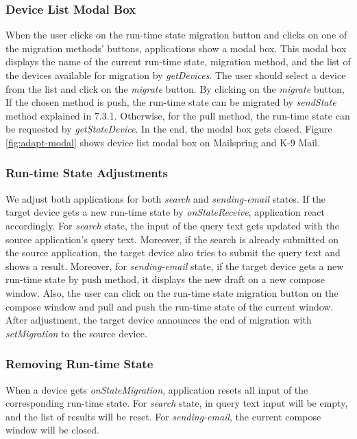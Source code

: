 \subsubsection{Device List Modal Box}
When the user clicks on the run-time state migration button and clicks on one of the migration methods' buttons, applications show a modal box. This modal box displays the name of the current run-time state, migration method, and the list of the devices available for migration by \textit{getDevices}. The user should select a device from the list and click on the \textit{migrate} button. By clicking on the \textit{migrate} button, If the chosen method is push, the run-time state can be migrated by \textit{sendState} method explained in 7.3.1. Otherwise, for the pull method, the run-time state can be requested by \textit{getStateDevice}. In the end, the modal box gets closed. Figure \ref{fig:adapt-modal} shows device list modal box on Mailspring and K-9 Mail.

\subsubsection{Run-time State Adjustments}
We adjust both applications for both \textit{search} and \textit{sending-email} states. If the target device gets a new run-time state by \textit{onStateReceive}, application react accordingly. For \textit{search} state, the input of the query text gets updated with the source application's query text. Moreover, if the search is already submitted on the source application, the target device also tries to submit the query text and shows a result. Moreover, for \textit{sending-email} state, if the target device gets a new run-time state by push method, it displays the new draft on a new compose window. Also, the user can click on the run-time state migration button on the compose window and pull and push the run-time state of the current window. After adjustment, the target device announces the end of migration with \textit{setMigration} to the source device.

\subsubsection{Removing Run-time State}
When a device gets \textit{onStateMigration}, application resets all input of the corresponding run-time state. For \textit{search} state, in query text input will be empty, and the list of results will be reset. For \textit{sending-email}, the current compose window will be closed.

